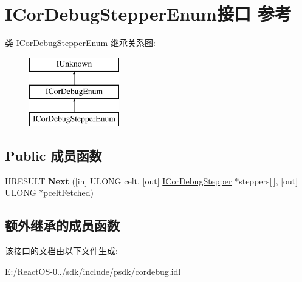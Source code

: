 \hypertarget{interface_i_cor_debug_stepper_enum}{}\section{I\+Cor\+Debug\+Stepper\+Enum接口 参考}
\label{interface_i_cor_debug_stepper_enum}
类 I\+Cor\+Debug\+Stepper\+Enum 继承关系图\+:\begin{figure}[H]
\begin{center}
\leavevmode
\includegraphics[height=3.000000cm]{interface_i_cor_debug_stepper_enum}
\end{center}
\end{figure}
\subsection*{Public 成员函数}
\begin{DoxyCompactItemize}
\item 
\mbox{\label{interface_i_cor_debug_stepper_enum_a3870628cd9bba9ed9843f5bf287af141}} 
H\+R\+E\+S\+U\+LT {\bfseries Next} (\mbox{[}in\mbox{]} U\+L\+O\+NG celt, \mbox{[}out\mbox{]} \hyperlink{interface_i_cor_debug_stepper}{I\+Cor\+Debug\+Stepper} $\ast$steppers\mbox{[}$\,$\mbox{]}, \mbox{[}out\mbox{]} U\+L\+O\+NG $\ast$pcelt\+Fetched)
\end{DoxyCompactItemize}
\subsection*{额外继承的成员函数}


该接口的文档由以下文件生成\+:\begin{DoxyCompactItemize}
\item 
E\+:/\+React\+O\+S-\/0../sdk/include/psdk/cordebug.\+idl\end{DoxyCompactItemize}
